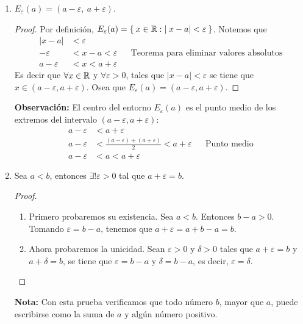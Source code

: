 \begin{enumerate}[label=\alph*)]
  
  \item $E_\varepsilon(a) = (a-\varepsilon, \ a+\varepsilon)$.
  
  \begin{proof}\leavevmode
    Por definición, $E_\varepsilon(a) = \Set{x\in \mathbb{R}: |x-a|<\varepsilon}$. Notemos que
    \begin{align*}
      |x - a | &< \varepsilon\\
      -\varepsilon &< x-a < \varepsilon && \text{Teorema para eliminar valores absolutos}\\
      a -\varepsilon &< x < a+ \varepsilon
    \end{align*}
    Es decir que $\forall x\in \mathbb{R}$ y $\forall \varepsilon>0$, tales que $|x-a|<\varepsilon$ se tiene que $x\in (a-\varepsilon, a+ \varepsilon)$. Osea que $E_\varepsilon(a) = (a-\varepsilon, a+\varepsilon)$.
  \end{proof}
  \textbf{Observación:} El centro del entorno $E_\varepsilon(a)$ es el punto medio de los extremos del intervalo $(a-\varepsilon, a+\varepsilon)$:
  \begin{align*}
    a - \varepsilon &< a + \varepsilon\\
    a- \varepsilon &< \frac{(a - \varepsilon)+(a + \varepsilon)}{2} < a + \varepsilon && \text{Punto medio}\\
    a- \varepsilon &< a < a + \varepsilon
  \end{align*}
  
  \item Sea $a<b$, entonces $\exists! \varepsilon>0$ tal que $a+\varepsilon=b$.
 \begin{proof}\leavevmode
  \begin{enumerate}[label=\roman*)]
    \item Primero probaremos su existencia. Sea $a<b$. Entonces $b-a>0$. Tomando $\varepsilon=b-a$, tenemos que $a+\varepsilon=a+b-a=b$.
    \item Ahora probaremos la unicidad. Sean $\varepsilon>0$ y $\delta>0$ tales que $a+\varepsilon=b$ y $a+\delta=b$, se tiene que $\varepsilon=b-a$ y $\delta=b-a$, es decir, $\varepsilon=\delta$. \qedhere
  \end{enumerate}
 \end{proof}
 
 \textbf{Nota:} Con esta prueba verificamos que todo número $b$, mayor que $a$, puede escribirse como la suma de $a$ y algún número positivo.
 

\end{enumerate}
